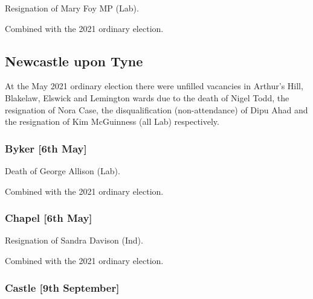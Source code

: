 \documentclass[a4paper,openany]{book}
\begin{document}
\begin{resultsiii}

Resignation of Mary Foy MP (Lab).

Combined with the 2021 ordinary election.

\subsection*{Newcastle upon Tyne}

At the May 2021 ordinary election there were unfilled vacancies in Arthur's Hill, Blakelaw, Elswick and Lemington wards due to the death of Nigel Todd, the resignation of Nora Case, the disqualification (non-attendance) of Dipu Ahad and the resignation of Kim McGuinness (all Lab) respectively.

\subsubsection*{Byker \hspace*{\fill}\nolinebreak[1]%
	\enspace\hspace*{\fill}
	[6th May]}


Death of George Allison (Lab).

Combined with the 2021 ordinary election.

\subsubsection*{Chapel \hspace*{\fill}\nolinebreak[1]%
	\enspace\hspace*{\fill}
	[6th May]}


Resignation of Sandra Davison (Ind).

Combined with the 2021 ordinary election.

\subsubsection*{Castle \hspace*{\fill}\nolinebreak[1]%
	\enspace\hspace*{\fill}
	[9th September]}


\end{resultsiii}
\end{document}

